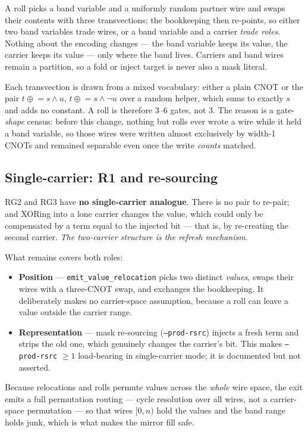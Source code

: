 \documentclass[11pt]{article}
\newcommand{\xor}{\oplus}
\newcommand{\code}[1]{\texttt{#1}}
\begin{document}
A roll picks a band variable and a uniformly random partner wire and swaps
their contents with three transvections; the bookkeeping then re-points, so
either two band variables trade wires, or a band variable and a carrier
\emph{trade roles}. Nothing about the encoding changes --- the band variable
keeps its value, the carrier keeps its value --- only where the band lives.
Carriers and band wires remain a partition, so a fold or inject target is never
also a mask literal.

Each transvection is drawn from a mixed vocabulary: either a plain CNOT or the
pair $t \mathrel{\xor}= s \wedge u$, $t \mathrel{\xor}= s \wedge \lnot u$ over a
random helper, which sums to exactly $s$ and adds no constant. A roll is
therefore 3--6 gates, not 3. The reason is a gate-\emph{shape} census: before
this change, nothing but rolls ever wrote a wire while it held a band variable,
so those wires were written almost exclusively by width-1 CNOTs and remained
separable even once the write \emph{counts} matched.

\subsection{Single-carrier: R1 and re-sourcing}

RG2 and RG3 have \textbf{no single-carrier analogue}. There is no pair to
re-pair; and XORing into a lone carrier changes the value, which could only be
compensated by a term equal to the injected bit --- that is, by re-creating the
second carrier. \emph{The two-carrier structure is the refresh mechanism.}

What remains covers both roles:

\begin{itemize}
\item \textbf{Position} --- \code{emit\_value\_relocation} picks two distinct
\emph{values}, swaps their wires with a three-CNOT swap, and exchanges the
bookkeeping. It deliberately makes no carrier-space assumption, because a roll
can leave a value outside the carrier range.
\item \textbf{Representation} --- mask re-sourcing (\code{--prod-rsrc}) injects
a fresh term and strips the old one, which genuinely changes the carrier's bit.
This makes \code{--prod-rsrc} $\ge 1$ load-bearing in single-carrier mode; it is
documented but not asserted.
\end{itemize}

Because relocations and rolls permute values across the \emph{whole} wire
space, the exit emits a full permutation routing --- cycle resolution over all
wires, not a carrier-space permutation --- so that wires $[0,n)$ hold the values
and the band range holds junk, which is what makes the mirror fill safe.
\end{document}
